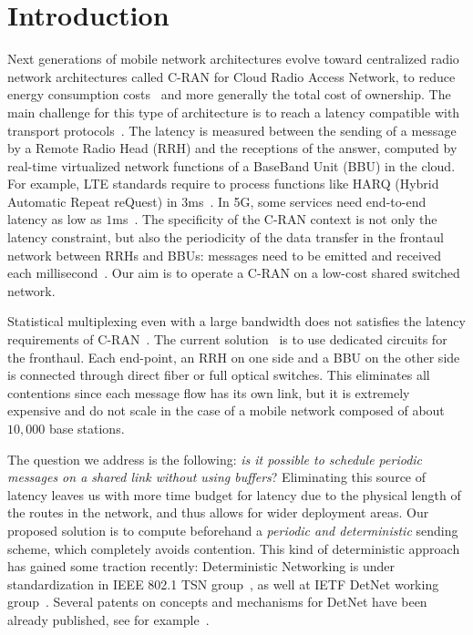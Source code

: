 \documentclass[a4paper,UKenglish,cleveref, autoref, thm-restate]{lipics-v2019}
\begin{document}
\section{Introduction}

Next generations of mobile network architectures evolve toward centralized radio network architectures called C-RAN for Cloud Radio Access Network, to reduce energy consumption costs~\cite{mobile2011c} and more generally the total cost of ownership. The main challenge for this type of architecture is to reach a latency compatible with transport protocols~\cite{ieeep802}. The latency is measured between the sending of a message by a Remote Radio Head (RRH) and the receptions of the answer, computed by real-time virtualized network functions of a BaseBand Unit (BBU) in the cloud. For example, LTE standards require to process functions like HARQ (Hybrid Automatic Repeat reQuest) in $3$ms~\cite{bouguen2012lte}. In 5G, some services need end-to-end latency as low as $1$ms~\cite{3gpp5g,boccardi2014five}. The specificity of the C-RAN context is not only the latency constraint, but also the periodicity of the data transfer in the frontaul network between RRHs and BBUs: messages need to be emitted and received each millisecond~\cite{bouguen2012lte}. Our aim is to operate a C-RAN on a low-cost shared switched network. 

 Statistical multiplexing even with a large bandwidth does not satisfies the latency requirements of C-RAN~\cite{dominique2018deterministic,barth2018deterministic}. The current solution~\cite{pizzinat2015things,tayq2017real} is to use dedicated circuits for the fronthaul. Each end-point, an RRH on one side and a BBU on the other side is connected through direct fiber or full optical switches. This eliminates all contentions since each message flow has its own link, but it is extremely expensive and do not scale in the case of a mobile network composed of about $10,000$ base stations. 

The question we address is the following: \emph{is it possible to schedule periodic messages on a shared link without using buffers}? Eliminating this source of latency leaves us with more time budget for latency due to the physical length of the routes in the network, and thus allows for wider deployment areas. Our proposed solution is to compute beforehand a \emph{periodic and deterministic} sending scheme, which completely avoids contention. This kind of deterministic approach has gained some traction recently: Deterministic Networking is under standardization in IEEE 802.1 TSN group~\cite{finn-detnet-architecture-08}, as well at IETF DetNet working group~\cite{ieee802}. Several patents on concepts and mechanisms for DetNet have been already published, see for example~\cite{howe2005time,leclerc2016transmission}. 
\end{document}
